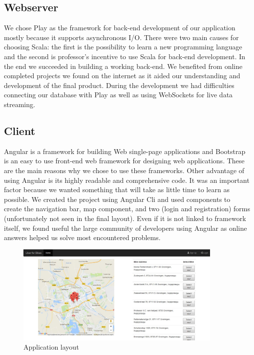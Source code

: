 \subsection{Webserver}
We chose Play as the framework for back-end development of our application mostly because it supports asynchronous I/O. There were two main causes for choosing Scala: the first is the possibility to learn a new programming language and the second is professor's incentive to use Scala for back-end development. In the end we succeeded in building a working back-end. We benefited from online completed projects we found on the internet as it aided our understanding and development of the final product. During the development we had difficulties connecting our database with Play as well as using WebSockets for live data streaming.

\subsection{Client}
Angular is a framework for building Web single-page applications and Bootstrap is an easy to use front-end web framework for designing web applications. These are the main reasons why we chose to use these frameworks. Other advantage of using Angular is its highly readable and comprehensive code. It was an important factor because we wanted something that will take as little time to learn as possible. We created the project using Angular Cli and used components to create the navigation bar, map component, and two (login and registration) forms (unfortunately not seen in the final layout). Even if it is not linked to framework itself, we found useful the large community of developers using Angular as online answers helped us solve most encountered problems.

\begin{figure}[H]
		\centering
		\includegraphics[width=0.9\textwidth]{images/screenshot.png}
		\caption{Application layout}
		\label{front-end}
	\end{figure}
